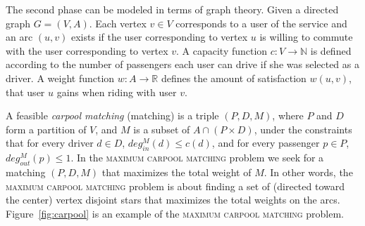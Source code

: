 \documentclass[draft]{article}
\def\CARPOOL{maximum carpool matching}
\newcommand{\din}[1][M]{deg^{#1}_{in}}
\newcommand{\dout}[1][M]{deg^{#1}_{out}}
\def\R{\mathbb{R}}
\def\N{\mathbb{N}}
\begin{document}
The second phase can be modeled in terms of graph theory.
Given a directed graph $G = (V, A)$.
Each vertex $v \in V$ corresponds to a user of the service and an arc
$(u, v)$ exists if the user corresponding to vertex $u$ is willing to
commute with the user corresponding to vertex $v$.
A capacity function $ c: V \rightarrow \N $ is defined
according to the number of passengers each user can drive if she was
selected as a driver.
A weight function $w : A \rightarrow \R $ defines the amount of
satisfaction $w(u, v)$,
that user $u$ gains when riding with user $v$.

A feasible \emph{carpool matching} (matching) is a triple 
$(P, D, M)$, where $P$ and $D$ form a partition of $V$, 
and $M$ is a subset of $A \cap (P \times D)$,
under the constraints that for every driver $d \in D$, 
$\din(d) \leq c(d)$, 
and for every passenger $p \in P$, ${\dout(p) \leq 1}$.
In the \textsc{\CARPOOL{}} problem we seek for a matching $(P, D, M)$ that maximizes the
total weight of $M$.
In other words, the \textsc{\CARPOOL{}} problem is about finding a set of 
(directed toward the center) vertex disjoint stars 
that maximizes the total weights on the arcs.
Figure~\ref{fig:carpool} is an example of the \textsc{\CARPOOL{}} problem.
\end{document}
